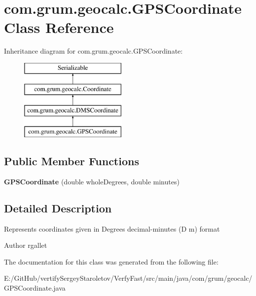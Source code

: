 \hypertarget{classcom_1_1grum_1_1geocalc_1_1_g_p_s_coordinate}{}\section{com.\+grum.\+geocalc.\+G\+P\+S\+Coordinate Class Reference}
\label{classcom_1_1grum_1_1geocalc_1_1_g_p_s_coordinate}
Inheritance diagram for com.\+grum.\+geocalc.\+G\+P\+S\+Coordinate\+:\begin{figure}[H]
\begin{center}
\leavevmode
\includegraphics[height=4.000000cm]{classcom_1_1grum_1_1geocalc_1_1_g_p_s_coordinate}
\end{center}
\end{figure}
\subsection*{Public Member Functions}
\begin{DoxyCompactItemize}
\item 
\mbox{\label{classcom_1_1grum_1_1geocalc_1_1_g_p_s_coordinate_a645aa2716a555339430c68230cecb1c1}} 
{\bfseries G\+P\+S\+Coordinate} (double whole\+Degrees, double minutes)
\end{DoxyCompactItemize}


\subsection{Detailed Description}
Represents coordinates given in Degrees decimal-\/minutes (D m) format

\begin{DoxyAuthor}{Author}
rgallet 
\end{DoxyAuthor}


The documentation for this class was generated from the following file\+:\begin{DoxyCompactItemize}
\item 
E\+:/\+Git\+Hub/vertify\+Sergey\+Staroletov/\+Verfy\+Fast/src/main/java/com/grum/geocalc/G\+P\+S\+Coordinate.\+java\end{DoxyCompactItemize}
